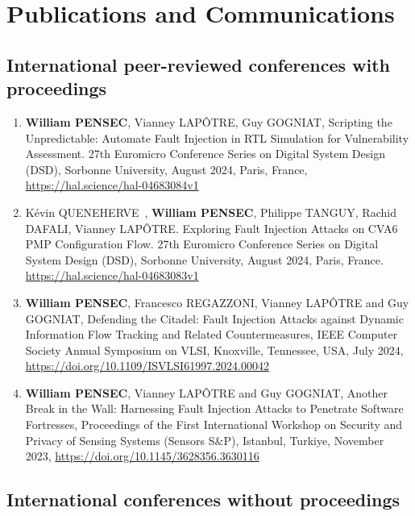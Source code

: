 \chapter{Publications and Communications}
\label{chapter:publi}
\section{International peer-reviewed conferences with proceedings}

\begin{enumerate}
    \item \textbf{William PENSEC}, Vianney LAPÔTRE, Guy GOGNIAT, Scripting the Unpredictable: Automate Fault Injection in RTL Simulation for Vulnerability Assessment. 27th Euromicro Conference Series on Digital System Design (DSD), Sorbonne University, August 2024, Paris, France, \url{https://hal.science/hal-04683084v1}
    \item Kévin QUENEHERVE~\cite{QPTDL-24-dsd}, \textbf{William PENSEC}, Philippe TANGUY, Rachid DAFALI, Vianney LAPÔTRE. Exploring Fault Injection Attacks on CVA6 PMP Configuration Flow. 27th Euromicro Conference Series on Digital System Design (DSD), Sorbonne University, August 2024, Paris, France. \url{https://hal.science/hal-04683083v1}
    \item \textbf{William PENSEC}, Francesco REGAZZONI, Vianney LAPÔTRE and Guy GOGNIAT, Defending the Citadel: Fault Injection Attacks against Dynamic Information Flow Tracking and Related Countermeasures, IEEE Computer Society Annual Symposium on VLSI, Knoxville, Tennessee, USA, July 2024, \url{https://doi.org/10.1109/ISVLSI61997.2024.00042}
    \item\textbf{William PENSEC}, Vianney LAPÔTRE and Guy GOGNIAT, Another Break in the Wall: Harnessing Fault Injection Attacks to Penetrate Software Fortresses, Proceedings of the First International Workshop on Security and Privacy of Sensing Systems (Sensors S\&P), Istanbul, Turkiye, November 2023, \url{https://doi.org/10.1145/3628356.3630116}
\end{enumerate}
\section{International conferences without proceedings}

